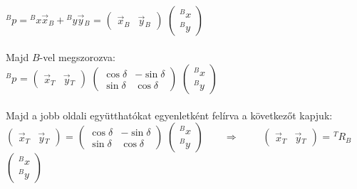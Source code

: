 $ {}^{B}p = {}^{B}x\vec{x}{}_{B} + {}^{B}y\vec{y}{}_{B} $  =
\(
\begin{pmatrix}
	\vec{x}{}_{B} & \vec{y}{}_{B}
\end{pmatrix}	 
\)
\(
\begin{pmatrix}
	{}^{B}x\\
	{}^{B}y
\end{pmatrix}	 
\)\\\\
Majd $ B $-vel megszorozva:\\

$ {}^{B}p $ =
\(
	\begin{pmatrix}
		\vec{x}{}_{T} & \vec{y}{}_{T}
	\end{pmatrix}
\)
\(
	\begin{pmatrix}
		\cos\delta & -\sin\delta\\
		\sin\delta & \cos\delta
	\end{pmatrix}
\)
\(
\begin{pmatrix}
	{}^{B}x\\
	{}^{B}y
\end{pmatrix}	 
\)\\\\
Majd a jobb oldali együtthatókat egyenletként felírva a következőt kapjuk:\\

\(
	\begin{pmatrix}
		\vec{x}{}_{T} & \vec{y}{}_{T}
	\end{pmatrix}
\) = 
\(
	\begin{pmatrix}
		\cos\delta & -\sin\delta\\
		\sin\delta & \cos\delta
	\end{pmatrix}
\)
\(
\begin{pmatrix}
	{}^{B}x\\
	{}^{B}y
\end{pmatrix}	 
\qquad \Rightarrow \qquad\)  
\(
	\begin{pmatrix}
		\vec{x}{}_{T} & \vec{y}{}_{T}
	\end{pmatrix}
\) = 
$ {}^{T}R{}_{B} $
\(
\begin{pmatrix}
	{}^{B}x\\
	{}^{B}y
\end{pmatrix}	 
\)\\\\

